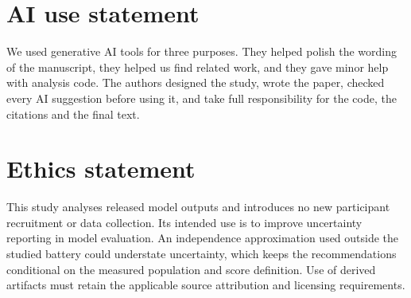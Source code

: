 \documentclass{article}
\begin{document}
\label{maintext:end}
\section*{AI use statement}
We used generative AI tools for three purposes. They helped polish the wording of the manuscript, they helped us find related work, and they gave minor help with analysis code. The authors designed the study, wrote the paper, checked every AI suggestion before using it, and take full responsibility for the code, the citations and the final text.

\section*{Ethics statement}
This study analyses released model outputs and introduces no new participant recruitment or data collection. Its intended use is to improve uncertainty reporting in model evaluation. An independence approximation used outside the studied battery could understate uncertainty, which keeps the recommendations conditional on the measured population and score definition. Use of derived artifacts must retain the applicable source attribution and licensing requirements.
\end{document}
